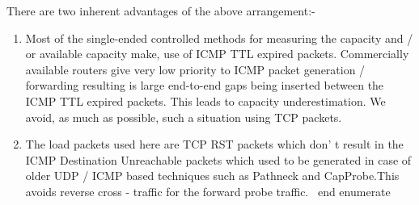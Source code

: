 \noindent There are two inherent advantages of the
 above arrangement:-
\begin{enumerate}
 \item Most of the single-ended controlled methods for measuring the
 capacity and / or available capacity make, use of ICMP TTL expired
 packets.  Commercially available routers give very low priority to
 ICMP packet generation / forwarding resulting is large end-to-end
 gaps being inserted between the ICMP TTL expired packets. This leads
 to capacity underestimation. We avoid, as much as possible, such a
 situation using TCP packets.
 \item The load packets used here are TCP RST packets which don' t result in
    the ICMP Destination Unreachable packets which used to be generated in case of older UDP / ICMP based techniques such as Pathneck and CapProbe.This avoids reverse cross - traffic for the forward probe traffic. \ end
  {
    enumerate
      }


\end{enumerate}
